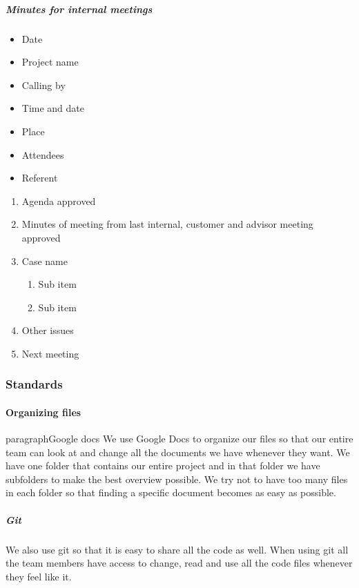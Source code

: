 \subparagraph{Minutes for internal meetings} \hfill
\begin{itemize}
\item{}Date
\item{}Project name
\item{}Calling by
\item{}Time and date 
\item{}Place 
\item{}Attendees 
\item{}Referent
\end{itemize}

\begin{enumerate}
\item{}Agenda approved
\item{}Minutes of meeting from last internal, customer and advisor meeting approved
\item{}Case name
\begin{enumerate}
\item{}Sub item
\item{}Sub item
\end{enumerate}
\item{}Other issues
\item{}Next meeting
\end{enumerate}

\subsubsection{Standards}

\paragraph{Organizing files}
paragraph{Google docs}\hfill
 We use Google Docs to organize our files so that our entire team can look at and change all the documents we have whenever they want. We have one folder that contains our entire project and in that folder we have subfolders to make the best overview possible. We try not to have too many files in each folder so that finding a specific document becomes as easy as possible.

\subparagraph{Git}\hfill 
We also use git so that it is easy to share all the code as well. When using git all the team members have access to change, read and use all the code files whenever they feel like it.

